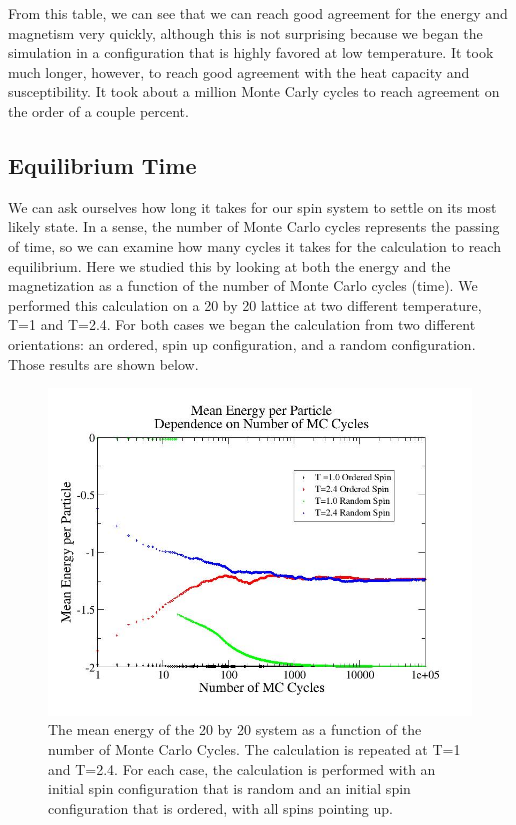 \documentclass[%
oneside,                 %
final,                   %
10pt]{article}
\begin{document}
From this table, we can see that we can reach good agreement for the energy and magnetism very quickly, although this is not surprising because we began the simulation in a configuration that is highly favored at low temperature.  It took much longer, however, to reach good agreement with the heat capacity and susceptibility.  It took about a million Monte Carly cycles to reach agreement on the order of a couple percent.

\subsection{Equilibrium Time}

We can ask ourselves how long it takes for our spin system to settle on its most likely state.  In a sense, the number of Monte Carlo cycles represents the passing of time, so we can examine how many cycles it takes for the calculation to reach equilibrium.  Here we studied this by looking at both the energy and the magnetization as a function of the number of Monte Carlo cycles (time).  We performed this calculation on a 20 by 20 lattice at two different temperature, T=1 and T=2.4.  For both cases we began the calculation from two different orientations: an ordered, spin up configuration, and a random configuration.  Those results are shown below.

\begin{figure}[H]\label{fig:MCEnergy}
  \centering
    \includegraphics[width=1.1 \textwidth]{MCEnergy.jpg}
    \caption{The mean energy of the 20 by 20 system as a function of the number of Monte Carlo Cycles.  The calculation is repeated at T=1 and T=2.4.  For each case, the calculation is performed with an initial spin configuration that is random and an initial spin configuration that is ordered, with all spins pointing up.}
\end{figure}
\end{document}

